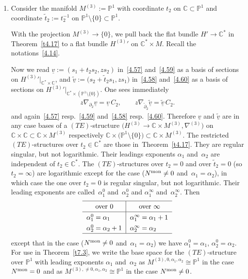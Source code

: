 \documentclass[10pt,a4paper]{amsart}
\numberwithin{equation}{section}
\numberwithin{figure}{section}
\newcommand{\C}{{\mathbb C}}
\renewcommand{\P}{{\mathbb P}}
\newcommand{\www}{\widetilde}
\newcommand{\uuuu}{\underline}
\newcommand{\paa}{\partial}
\newcommand{\nnn}{\nabla}
\begin{document}
\begin{Remarks}\label{t7.1}\qquad

\begin{enumerate}\itemsep=0pt
\item[$(i)$] Consider the manifold $M^{(3)}:=\P^1$ with coordinate
$t_2$ on $\C\subset\P^1$ and coordinate
$\www t_2:=t_2^{-1}$ on $\P^1\setminus\{0\}\subset\P^1$.

With the projection $M^{(3)}\to\{0\}$,
we pull back the flat bundle $H'\to\C^*$ in Theorem~\ref{t4.17} to a flat bundle ${{H^{(3)}}'}$ on
$\C^*\times M$. Recall the notations~\eqref{4.14}.

Now we read $\uuuu{v}:=(s_1+t_2s_2,zs_2)$
in~\eqref{4.57} and~\eqref{4.59}
as a basis of sections on ${{H^{(3)}}'}|_{\C^*\times\C}$,
and $\uuuu{\www v}:=\big(s_2+\www t_2s_1,zs_1\big)$
in~\eqref{4.58} and~\eqref{4.60}
as a basis of sections on ${{H^{(3)}}'}|_{\C^*\times(\P^1\setminus\{0\})}$.
One sees immediately
\begin{gather}\label{7.1}
z\nnn_{\paa_2}\uuuu{v}=\uuuu{v}\, C_2,\qquad
z\nnn_{\www \paa_2}\uuuu{\www v}=\uuuu{\www v}\, C_2.
\end{gather}
and again~\eqref{4.57} resp.~\eqref{4.59}
and~\eqref{4.58} resp.~\eqref{4.60}.
Therefore $\uuuu{v}$ and $\uuuu{\www v}$ are in any case bases
of a $(TE)$-structure $\big(H^{(3)}\to\C\times M^{(3)},\nnn^{(3)}\big)$
on $\C\times \C\subset\C\times M^{(3)}$ respectively
$\C\times \big(\P^1\setminus\{0\}\big)\subset\C\times M^{(3)}$.
The restricted $(TE)$-structures over $t_2\in\C^*$ are
those in~Theo\-rem~\ref{t4.17}.
They are regular singular, but not logarithmic.
Their leadings exponents $\alpha_1$ and~$\alpha_2$ are
independent of $t_2\in\C^*$.
The $(TE)$-structures over $t_2=0$ and over $\www t_2=0$
(so $t_2=\infty$) are logarithmic except for the case
($N^{\rm mon}\neq 0$ and~$\alpha_1=\alpha_2$), in which case
the one over $t_2=0$ is regular singular, but not logarithmic.
Their leading exponents are
called~$\alpha_1^0$ and~$\alpha_2^0$ and
$\alpha_1^\infty$ and~$\alpha_2^\infty$. Then
\[
\def\arraystretch{1.3}
\begin{tabular}{l|l}
\hline
\quad\ over $0$ & \quad\ over $\infty$
\\ \hline
$\alpha_1^0=\alpha_1$ & $\alpha_1^\infty=\alpha_1+1$
\\
$\alpha_2^0=\alpha_2+1$ & $\alpha_2^\infty=\alpha_2$
\\
\hline
\end{tabular}
\]
except that in the case
($N^{\rm mon}\neq 0$ and~$\alpha_1=\alpha_2$)
we have $\alpha_1^0=\alpha_1$, $\alpha_2^0=\alpha_2$.
For use in Theorem~\ref{t7.3}, we write the base space
for the $(TE)$-structure over $\P^1$ with leading exponents
$\alpha_1$ and~$\alpha_2$ as
$M^{(3),0,\alpha_1,\alpha_2}\cong\P^1$ in the case
$N^{\rm mon}=0$ and as $M^{(3),\neq 0,\alpha_1,\alpha_2}\cong\P^1$
in the case $N^{\rm mon}\neq 0$.


\end{enumerate}
\end{Remarks}
\end{document}
